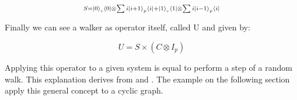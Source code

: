 \begin{equation}
    \scriptstyle S = \ket{0}_{c} \bra{0} \otimes \sum{i} \ket{i + 1}_{p} \bra{i} + \ket{1}_{c} \bra{1} \otimes \sum{i} \ket{i - 1}_{p} \bra{i} 
\end{equation}

Finally we can see a walker as operator itself, called U and given by:

\begin{equation}
    U = S \times (C \otimes I_{p})
\end{equation}

Applying this operator to a given system is equal to perform a step of a random walk. This explanation derives from \cite{6812670} and \cite{Kempe_2003}.
The example on the following section apply this general concept to a cyclic graph.






